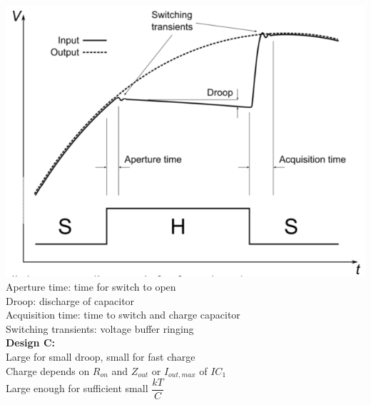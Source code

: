 \documentclass[5pt,landscape]{article}
\begin{document}
\begin{multicols*}{5}
\includegraphics[width=\columnwidth]{images/sample_hold_char.png}\\
Aperture time: time for switch to open\\
Droop: discharge of capacitor\\
Acquisition time: time to switch and charge capacitor\\
Switching transients: voltage buffer ringing\\
\textbf{Design C:}\\
Large for small droop, small for fast charge\\
Charge depends on $ R_{on} $ and $ Z_{out} $ or $ I_{out,max} $ of $ IC_1 $\\
Large enough for sufficient small $ \dfrac{kT}{C} $

\end{multicols*}
\end{document}
